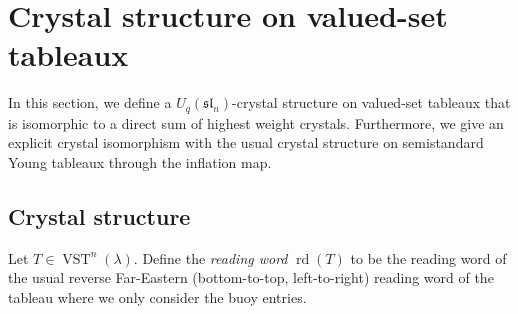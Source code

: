 \documentclass[ALCO,ThmDefs,Unicode,epreuves]{cedram}
\newcommand{\fsl}{\mathfrak{sl}}
\DeclareMathOperator{\rd}{rd} %
\DeclareMathOperator{\vst}{VST} %
\newcommand{\defn}[1]{{\color{darkred}\emph{#1}}} %
\begin{document}
\section{Crystal structure on valued-set tableaux}
\label{sec:vst}

In this section, we define a $U_q(\fsl_n)$-crystal structure on valued-set tableaux that is isomorphic to a direct sum of highest weight crystals. Furthermore, we give an explicit crystal isomorphism with the usual crystal structure on semistandard Young tableaux through the inflation map.

\subsection{Crystal structure}

\begin{defi}
Let $T \in \vst^n(\lambda)$. Define the \defn{reading word} $\rd(T)$ to be the reading word of the usual reverse Far-Eastern (bottom-to-top, left-to-right) reading word of the tableau where we only consider the buoy entries.
\end{defi}
\end{document}
